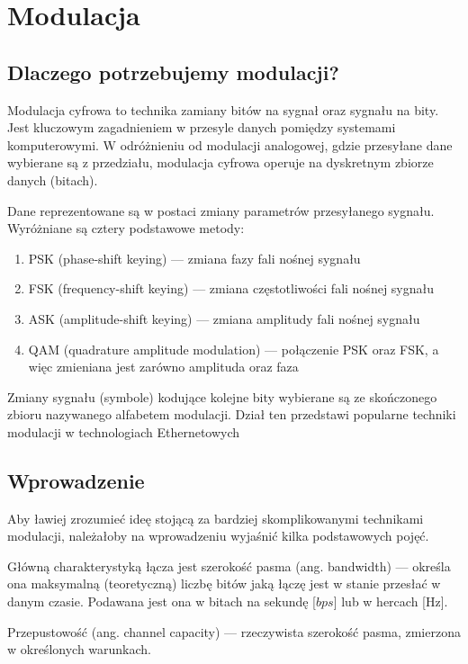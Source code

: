 \section{Modulacja}

\subsection{Dlaczego potrzebujemy modulacji?}

Modulacja cyfrowa to technika zamiany bitów na sygnał oraz sygnału na bity. Jest kluczowym zagadnieniem w przesyle danych pomiędzy systemami komputerowymi. W odróżnieniu od modulacji analogowej, gdzie przesyłane dane wybierane są z przedziału,
modulacja cyfrowa operuje na dyskretnym zbiorze danych (bitach).

Dane reprezentowane są w postaci zmiany parametrów przesyłanego sygnału. Wyróżniane są cztery podstawowe metody:

\begin{enumerate}
    \item PSK (phase-shift keying) --- zmiana fazy fali nośnej sygnału
    \item FSK (frequency-shift keying) --- zmiana częstotliwości fali nośnej sygnału
    \item ASK (amplitude-shift keying) --- zmiana amplitudy fali nośnej sygnału
    \item QAM (quadrature amplitude modulation) --- połączenie PSK oraz FSK, a więc zmieniana jest zarówno amplituda oraz faza
\end{enumerate}

Zmiany sygnału (symbole) kodujące kolejne bity wybierane są ze skończonego zbioru nazywanego alfabetem modulacji.
Dział ten przedstawi popularne techniki modulacji w technologiach Ethernetowych

\subsection{Wprowadzenie}

Aby ławiej zrozumieć ideę stojącą za bardziej skomplikowanymi technikami modulacji, należałoby na wprowadzeniu wyjaśnić kilka podstawowych pojęć.

Główną charakterystyką łącza jest szerokość pasma (ang. bandwidth) --- określa ona maksymalną (teoretyczną) liczbę bitów jaką łączę jest w stanie przesłać w danym czasie. Podawana jest ona w bitach na sekundę [$bps$] lub w hercach [Hz].

Przepustowość (ang. channel capacity) --- rzeczywista szerokość pasma, zmierzona w określonych warunkach.

